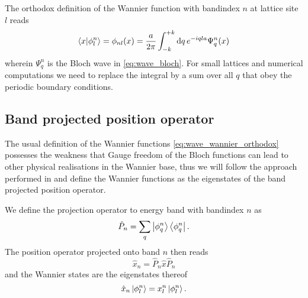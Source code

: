 The orthodox definition of the Wannier function with bandindex $n$ at lattice
site $l$ reads
\begin{equation}
  \bra{x}\ket{\phi^n_{l}}
  =\phi_{nl}(x)
  =\frac{a}{2\pi}\int_{-k}^{+k}\dd{q}e^{-iqla}\Psi^n_{q}(x)
  \label{eq:wave_wannier_orthodox}
\end{equation}
wherein $\Psi^n_{q}$ is the Bloch wave in \cref{eq:wave_bloch}. For small
lattices and numerical computations we need to replace the integral by a sum
over all $q$ that obey the periodic boundary conditions.

\subsection{Band projected position operator}

The usual definition of the Wannier functions \cref{eq:wave_wannier_orthodox}
possesses the weakness that Gauge freedom of the Bloch functions can lead to
other physical realisations in the Wannier base, thus we will follow the
approach performed in \cite{Goerg2014} and define the Wannier functions
as the eigenstates of the band projected position operator.

We define the projection operator to energy band with bandindex $n$ as
\begin{equation}
  \hat{P}_n
  =\sum_q\ket{\phi^n_{q}}\bra{\phi^n_{q}}
  \label{eq:projection_band}.
\end{equation}
The position operator projected onto band $n$ then reads
\begin{equation}
  \hat{x}_n
  =\hat{P}_n\hat{x}\hat{P}_n
  \label{eq:position_projected_band}
\end{equation}
and the Wannier states are the eigenstates thereof
\begin{equation}
  \hat{x}_n\ket{\phi^n_{l}}=x^n_{l}\ket{\phi^n_{l}}
  \label{eq:eigenvalue_position_projected_band}.
\end{equation}

